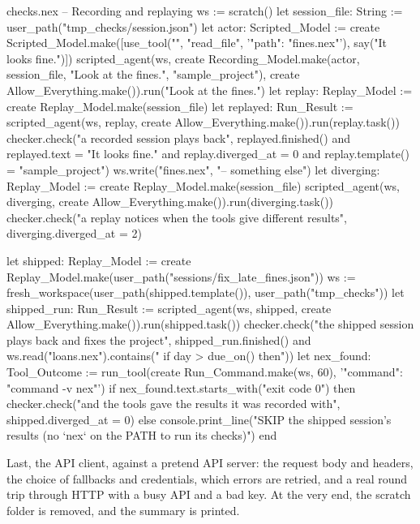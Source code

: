 \begin{continued}{checks.nex}
-- Recording and replaying
ws := scratch()
let session_file: String := user_path("tmp_checks/session.json")
let actor: Scripted_Model := create Scripted_Model.make([use_tool("", "read_file", '{"path": "fines.nex"}'),
  say("It looks fine.")])
scripted_agent(ws, create Recording_Model.make(actor, session_file, "Look at the fines.", "sample_project"),
  create Allow_Everything.make()).run("Look at the fines.")
let replay: Replay_Model := create Replay_Model.make(session_file)
let replayed: Run_Result := scripted_agent(ws, replay, create Allow_Everything.make()).run(replay.task())
checker.check("a recorded session plays back", replayed.finished() and replayed.text = "It looks fine."
  and replay.diverged_at = 0 and replay.template() = "sample_project")
ws.write("fines.nex", "-- something else\n")
let diverging: Replay_Model := create Replay_Model.make(session_file)
scripted_agent(ws, diverging, create Allow_Everything.make()).run(diverging.task())
checker.check("a replay notices when the tools give different results", diverging.diverged_at = 2)

let shipped: Replay_Model := create Replay_Model.make(user_path("sessions/fix_late_fines.json"))
ws := fresh_workspace(user_path(shipped.template()), user_path("tmp_checks"))
let shipped_run: Run_Result := scripted_agent(ws, shipped, create Allow_Everything.make()).run(shipped.task())
checker.check("the shipped session plays back and fixes the project", shipped_run.finished()
  and ws.read("loans.nex").contains("    if day > due_on() then\n"))
let nex_found: Tool_Outcome := run_tool(create Run_Command.make(ws, 60), '{"command": "command -v nex"}')
if nex_found.text.starts_with("exit code 0") then
  checker.check("and the tools gave the results it was recorded with", shipped.diverged_at = 0)
else
  console.print_line("SKIP the shipped session's results (no `nex` on the PATH to run its checks)")
end
\end{continued}

Last, the API client, against a pretend API server: the request body and
headers, the choice of fallbacks and credentials, which errors are retried,
and a real round trip through HTTP with a busy API and a bad key. At the
very end, the scratch folder is removed, and the summary is printed.


